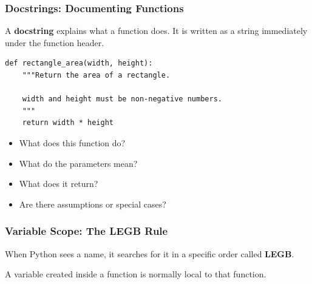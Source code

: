 \documentclass[aspectratio=169,10pt]{beamer}
\newcommand{\keyword}[1]{\textcolor{PrimaryBlue}{\textbf{#1}}}
\begin{document}
\begin{frame}[fragile]
\frametitle{Docstrings: Documenting Functions}
\small
A \keyword{docstring} explains what a function does. It is written as a string immediately under the function header.

\vspace{0.1cm}
\begin{lstlisting}[style=pycode]
def rectangle_area(width, height):
    """Return the area of a rectangle.

    width and height must be non-negative numbers.
    """
    return width * height
\end{lstlisting}

\begin{tcolorbox}[lecturebox,title=Good docstrings answer]
\begin{itemize}\setlength\itemsep{0.05cm}
  \item What does this function do?
  \item What do the parameters mean?
  \item What does it return?
  \item Are there assumptions or special cases?
\end{itemize}
\end{tcolorbox}
\end{frame}

\begin{frame}[fragile]
\frametitle{Variable Scope: The LEGB Rule}
\small
When Python sees a name, it searches for it in a specific order called \keyword{LEGB}.

\vspace{0.10cm}
\begin{center}
\end{center}

\begin{tcolorbox}[lecturebox,title=Key idea]
A variable created inside a function is normally local to that function.
\end{tcolorbox}
\end{frame}
\end{document}
